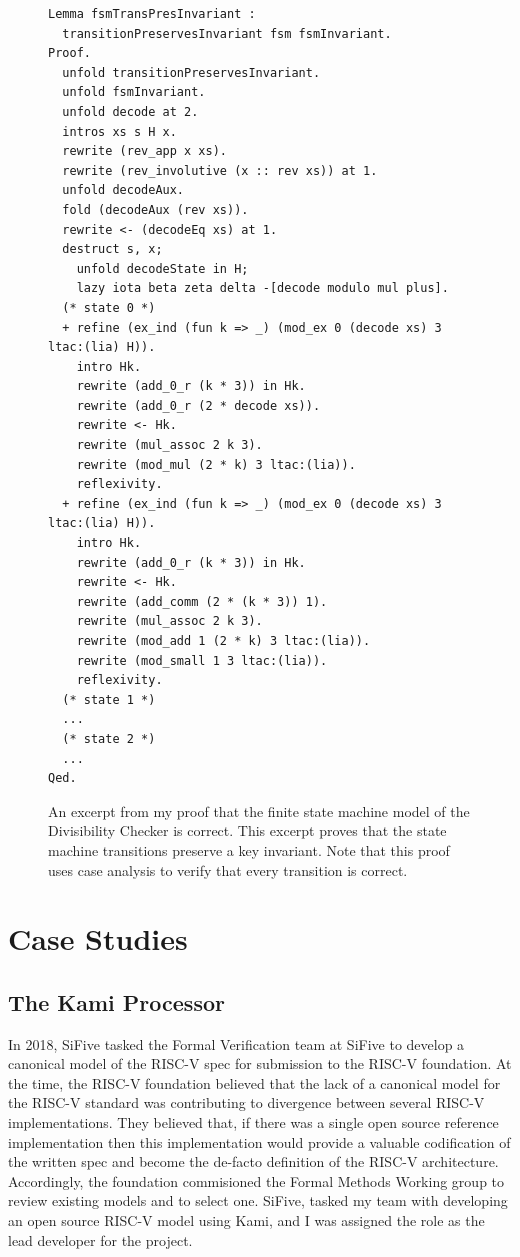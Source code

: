 \documentclass[10pt,a4paper]{article}
\begin{document}
\begin{figure}
\centering
\begin{verbatim}
Lemma fsmTransPresInvariant :
  transitionPreservesInvariant fsm fsmInvariant.
Proof.
  unfold transitionPreservesInvariant.
  unfold fsmInvariant.
  unfold decode at 2.
  intros xs s H x.
  rewrite (rev_app x xs).
  rewrite (rev_involutive (x :: rev xs)) at 1.
  unfold decodeAux.
  fold (decodeAux (rev xs)).
  rewrite <- (decodeEq xs) at 1.
  destruct s, x;
    unfold decodeState in H;
    lazy iota beta zeta delta -[decode modulo mul plus].
  (* state 0 *)
  + refine (ex_ind (fun k => _) (mod_ex 0 (decode xs) 3 ltac:(lia) H)).
    intro Hk.
    rewrite (add_0_r (k * 3)) in Hk.
    rewrite (add_0_r (2 * decode xs)).
    rewrite <- Hk.
    rewrite (mul_assoc 2 k 3).
    rewrite (mod_mul (2 * k) 3 ltac:(lia)).
    reflexivity.
  + refine (ex_ind (fun k => _) (mod_ex 0 (decode xs) 3 ltac:(lia) H)).
    intro Hk.
    rewrite (add_0_r (k * 3)) in Hk.
    rewrite <- Hk.
    rewrite (add_comm (2 * (k * 3)) 1).
    rewrite (mul_assoc 2 k 3).
    rewrite (mod_add 1 (2 * k) 3 ltac:(lia)).
    rewrite (mod_small 1 3 ltac:(lia)).
    reflexivity.
  (* state 1 *)
  ...
  (* state 2 *)
  ...
Qed.
\end{verbatim}
\caption{An excerpt from my proof that the finite state machine model of the Divisibility Checker is correct. This excerpt proves that the state machine transitions preserve a key invariant. Note that this proof uses case analysis to verify that every transition is correct.}
\label{fsm-lemma}
\end{figure}

\pagebreak

\section{Case Studies}

\subsection{The Kami Processor}

In 2018, SiFive tasked the Formal Verification team at SiFive to develop a canonical model of the RISC-V spec for submission to the RISC-V foundation. At the time, the RISC-V foundation believed that the lack of a canonical model for the RISC-V standard was contributing to divergence between several RISC-V implementations. They believed that, if there was a single open source reference implementation then this implementation would provide a valuable codification of the written spec and become the de-facto definition of the RISC-V architecture. Accordingly, the foundation commisioned the Formal Methods Working group to review existing models and to select one. SiFive, tasked my team with developing an open source RISC-V model using Kami, and I was assigned the role as the lead developer for the project.
\end{document}
